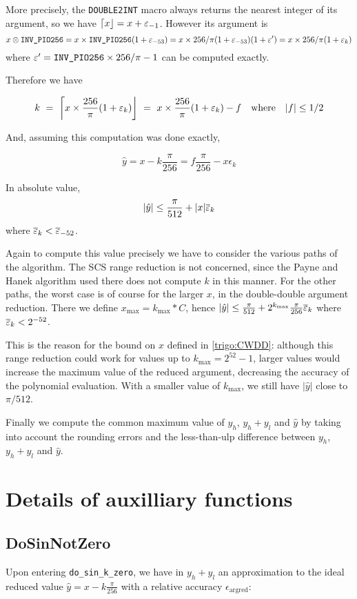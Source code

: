 More precisely, the \texttt{DOUBLE2INT} macro always returns the
nearest integer of its argument, so we have
$\left\lceil x \right\rfloor=x+\varepsilon_{-1}$. However its argument is
$$x\otimes\verb!INV_PIO256! = x \times
\verb!INV_PIO256!(1+\epsilon_{-53}) = x\times
256/\pi(1+\epsilon_{-53})(1+\epsilon')  = x\times
256/\pi(1+\epsilon_k)$$
where $\epsilon'=\verb!INV_PIO256!\times256/\pi-1$ can be
computed exactly.

Therefore we have 

$$k\ =\ \left\lceil x\times \frac{256}{\pi}(1+\varepsilon_k) \right\rfloor
\ =\ x\times \frac{256}{\pi}(1+\varepsilon_k) - f \quad\mbox{where} \quad |f|\le 1/2
$$

And, assuming this computation was done exactly,

$$\hat{y}=x-k\frac{\pi}{256} = f\frac{\pi}{256} - x\epsilon_k$$

In absolute value, $$\left|\hat{y}\right| \le \frac{\pi}{512} +
|x|{\overline{\varepsilon}}_k$$
where ${\overline{\varepsilon}}_k<{\overline{\varepsilon}}_{-52}$.

Again to compute this value precisely we have to consider the various
paths of the algorithm. The SCS range reduction is not concerned,
since the Payne and Hanek algorithm used there does not compute $k$ in
this manner. For the other paths, the worst case is of course for the
larger $x$, in the double-double argument reduction. There we define
$x_{\max} = k_{\max}*C$, hence  $\left|\hat{y}\right|
\le \frac{\pi}{512} + 2^{k_{\max}}\frac{\pi}{256}{\overline{\varepsilon}}_k$ where
${\overline{\varepsilon}}_k<2^{-52}$.


This is the reason for the bound on $x$ defined in \ref{trigo:CWDD}:
although this range reduction could work for values up to
$k_{\max}=2^{52}-1$, larger values would increase the maximum
value of the reduced argument, decreasing the accuracy of the
polynomial evaluation. With a smaller value of $k_{\max}$, we still have
$\left|\hat{y}\right|$ close to $\pi/512$. 

Finally we compute the common maximum value of $y_h$, $y_h+y_l$ and
$\widehat{y}$ by taking into account the rounding errors and the
less-than-ulp difference between $y_h$, $y_h+y_l$ and $\widehat{y}$.
 



\section{Details of auxilliary functions
  \label{trigo:auxilliary}}

\subsection{DoSinNotZero \label{dosinzero}}
Upon entering  \texttt{do\_sin\_k\_zero}, we have in
$y_h+y_l$ an approximation to the ideal reduced value
$\hat{y}=x-k\frac{\pi}{256}$ with a relative accuracy $\epsilon_{\mathrm{argred}}$:

